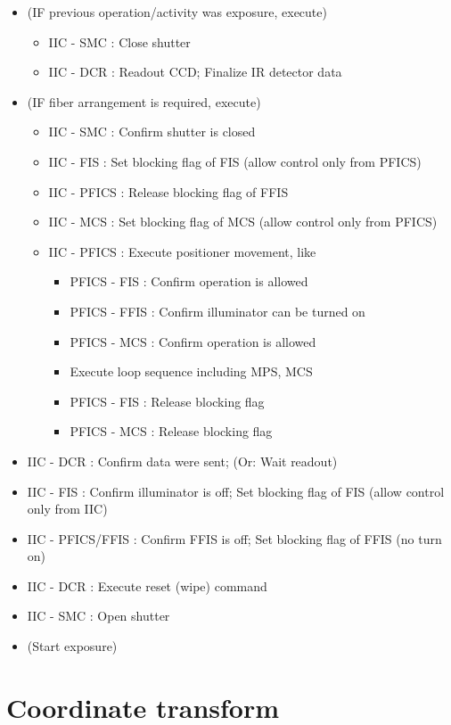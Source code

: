 \documentclass[a4paper,notitlepage]{article}
\begin{document}
\begin{itemize}
  \item (IF previous operation/activity was exposure, execute)
  \begin{itemize}
    \item IIC - SMC : Close shutter
    \item IIC - DCR : Readout CCD; Finalize IR detector data
  \end{itemize}
  \item (IF fiber arrangement is required, execute)
  \begin{itemize}
    \item IIC - SMC : Confirm shutter is closed
    \item IIC - FIS : Set blocking flag of FIS (allow control only from PFICS)
    \item IIC - PFICS : Release blocking flag of FFIS
    \item IIC - MCS : Set blocking flag of MCS (allow control only from PFICS)
    \item IIC - PFICS : Execute positioner movement, like
    \begin{itemize}
      \item PFICS - FIS : Confirm operation is allowed
      \item PFICS - FFIS : Confirm illuminator can be turned on
      \item PFICS - MCS : Confirm operation is allowed
      \item Execute loop sequence including MPS, MCS
      \item PFICS - FIS : Release blocking flag
      \item PFICS - MCS : Release blocking flag
    \end{itemize}
  \end{itemize}
  \item IIC - DCR : Confirm data were sent; (Or: Wait readout)
  \item IIC - FIS : Confirm illuminator is off; Set blocking flag of FIS (allow control only from IIC)
  \item IIC - PFICS/FFIS : Confirm FFIS is off; Set blocking flag of FFIS (no turn on)
  \item IIC - DCR : Execute reset (wipe) command
  \item IIC - SMC : Open shutter
  \item (Start exposure)
\end{itemize}



\section{Coordinate transform}
\end{document}
